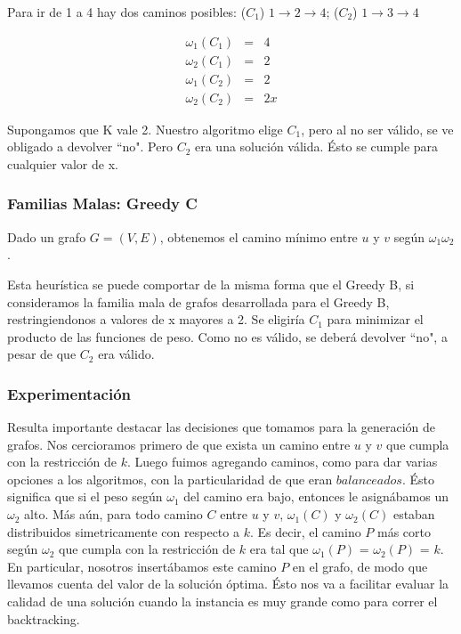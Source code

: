 Para ir de 1 a 4 hay dos caminos posibles: ($C_1$) $1 \rightarrow 2 \rightarrow 4$; ($C_2$) $1 \rightarrow 3 \rightarrow 4$

\begin{eqnarray}
 \omega_1(C_1) &=& 4 	\\ 
 \omega_2(C_1) &=& 2	\\
 \omega_1(C_2) &=& 2	\\
 \omega_2(C_2) &=& 2x
\end{eqnarray}

Supongamos que K vale 2. Nuestro algoritmo elige $C_1$, pero al no ser válido, se ve obligado a devolver ``no". Pero $C_2$ era una solución
válida. Ésto se cumple para cualquier valor de x.

\clearpage
\subsubsection{Familias Malas: Greedy C}\label{subsubsec:greedy-c}
Dado un grafo $G = (V,E)$, obtenemos el camino m\'inimo entre $u$ y $v$ seg\'un $\omega_1\omega_2$. 

Esta heurística se puede comportar de la misma forma que el Greedy B, si consideramos la familia mala de grafos desarrollada para el Greedy B,
restringiendonos a valores de x mayores a 2. Se eligiría $C_1$  para minimizar el producto de las funciones de peso. Como no es válido,
se deberá devolver ``no", a pesar de que $C_2$ era válido. 

\subsubsection{Experimentación}
Resulta importante destacar las decisiones que tomamos para la generación de grafos. Nos cercioramos primero de que exista un camino entre $u$ y
$v$ que cumpla con la restricción de $k$. Luego fuimos agregando caminos, como para dar varias opciones a los algoritmos, con la particularidad
de que eran $balanceados$. Ésto significa que si el peso según $\omega_1$ del camino era bajo, entonces le asignábamos un $\omega_2$ alto.
Más aún, para todo camino $C$ entre $u$ y $v$, $\omega_1(C)$ y $\omega_2(C)$ estaban distribuidos simetricamente con respecto a $k$.
Es decir, el camino $P$ más corto según $\omega_2$ que cumpla con la restricción de $k$ era tal que $\omega_1(P)$ = $\omega_2(P)$ = $k$.
En particular, nosotros insertábamos este camino $P$ en el grafo, de modo que llevamos cuenta del valor de la solución óptima. Ésto nos va a
facilitar evaluar la calidad de una solución cuando la instancia es muy grande como para correr el backtracking.

